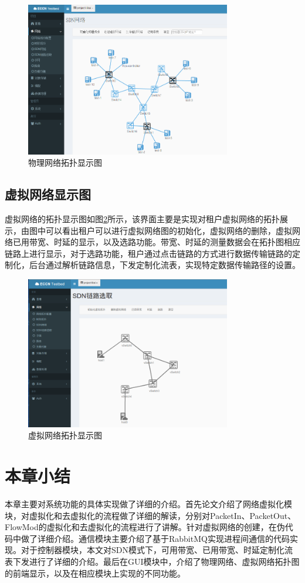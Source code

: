\begin{figure}[!htb]
  \centering
  \includegraphics[width=0.8\textwidth]{logo/physicalnet.png}
  \caption{物理网络拓扑显示图}
  \label{fig:physicalnet}
\end{figure}

\subsection{虚拟网络显示图}
虚拟网络的拓扑显示图如图\ref{fig:virtualnet}所示，该界面主要是实现对租户虚拟网络的拓扑展示，由图中可以看出租户可以进行虚拟网络图的初始化，虚拟网络的删除，虚拟网络已用带宽、时延的显示，以及选路功能。带宽、时延的测量数据会在拓扑图相应链路上进行显示，对于选路功能，租户通过点击链路的方式进行数据传输链路的定制化，后台通过解析链路信息，下发定制化流表，实现特定数据传输路径的设置。

\begin{figure}[!htb]
  \centering
  \includegraphics[width=0.8\textwidth]{logo/virtualnet.png}
  \caption{虚拟网络拓扑显示图}
  \label{fig:virtualnet}
\end{figure}

\section{本章小结}
本章主要对系统功能的具体实现做了详细的介绍。首先论文介绍了网络虚拟化模块，对虚拟化和去虚拟化的流程做了详细的解读，分别对PacketIn、PacketOut、FlowMod的虚拟化和去虚拟化的流程进行了讲解。针对虚拟网络的创建，在伪代码中做了详细介绍。通信模块主要介绍了基于RabbitMQ实现进程间通信的代码实现。对于控制器模块，本文对SDN模式下，可用带宽、已用带宽、时延定制化流表下发进行了详细的介绍。最后在GUI模块中，介绍了物理网络、虚拟网络拓扑图的前端显示，以及在相应模块上实现的不同功能。